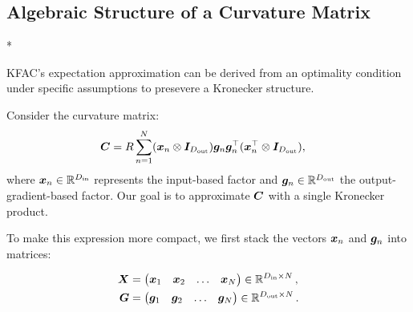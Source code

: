 \subsection{Algebraic Structure of a Curvature Matrix}

\switchcolumn[1]*
\begin{example}
  \label{ex:just_kfac_exp_approx}
  KFAC's expectation approximation can be derived from an optimality condition under specific assumptions to presevere a Kronecker structure.

  Consider the curvature matrix:
  \begin{align*}
    {\bm{C}}
    &=
      R \sum_{n=1}^N
      ({\bm{x}}_n \otimes {\bm{I}}_{D_{\text{out}}})
      {\bm{g}}_n {\bm{g}}_n^{\top}
      ({\bm{x}}_n^{\top} \otimes {\bm{I}}_{D_{\text{out}}}),
  \end{align*}
  where ${\bm{x}}_n \in {\mathbb{R}}^{D_{\text{in}}}$ represents the input-based factor and ${\bm{g}}_n \in {\mathbb{R}}^{D_{\text{out}}}$ the output-gradient-based factor. Our goal is to approximate ${\bm{C}}$ with a single Kronecker product.

  To make this expression more compact, we first stack the vectors ${\bm{x}}_n$ and ${\bm{g}}_n$ into matrices:

  \begin{align*}
    {\bm{X}}
    &=
      \begin{pmatrix}
        {\bm{x}}_1 & {\bm{x}}_2 & \ldots & {\bm{x}}_N
      \end{pmatrix}
      \in {\mathbb{R}}^{D_{\text{in}} \times N}\,,
    \\
    {\bm{G}}
    &=
      \begin{pmatrix}
        {\bm{g}}_1 & {\bm{g}}_2 & \ldots & {\bm{g}}_N
      \end{pmatrix}
      \in {\mathbb{R}}^{D_{\text{out}} \times N}\,.
  \end{align*}


\end{example}
